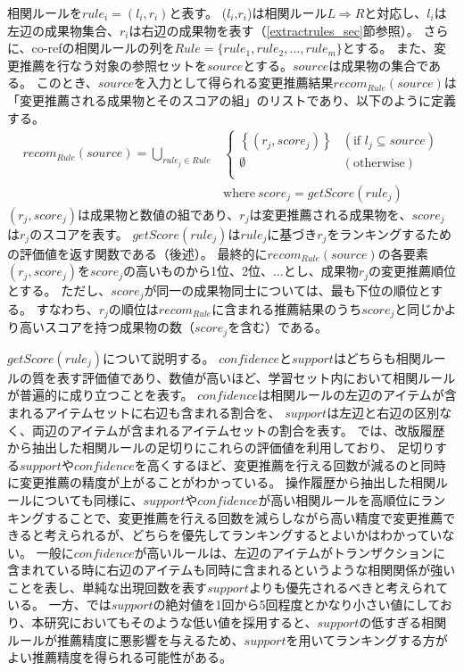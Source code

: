 \documentclass[a4paper]{jsbook}
\def\Ra{\Rightarrow}
\newcommand{\confidence}{con\!f\!idence}
\newcommand{\getScore}{getS\!core}
\begin{document}
相関ルールを$rule_i = (l_i,r_i)$と表す。
($l_i$,$r_i$)は相関ルール$L \Ra R$と対応し、$l_i$は左辺の成果物集合、$r_i$は右辺の成果物を表す（\ref{extractrules_sec}節参照）。
さらに、co-refの相関ルールの列を$Rule = \{rule_1, rule_2, \dots, rule_m\}$とする。
また、変更推薦を行なう対象の参照セットを$source$とする。$source$は成果物の集合である。
このとき、$source$を入力として得られる変更推薦結果$recom_{Rule}(source)$は「変更推薦される成果物とそのスコアの組」のリストであり、以下のように定義する。
\begin{eqnarray}
  recom_{Rule}\left(source\right) = \bigcup_{rule_j \in Rule}
    &\left\{
    \begin{array}{ll}
      \left\{\left(r_j,score_j \right)\right\} &(\textrm{if~} l_j \subseteq source) \\
      \emptyset &(\textrm{otherwise})\\
    \end{array}
    \right.\\
    &\textrm{where}~score_j = \getScore(rule_j)\nonumber
\end{eqnarray}
$\left(r_j,score_j\right)$は成果物と数値の組であり、$r_j$は変更推薦される成果物を、$score_j$は$r_j$のスコアを表す。
$\getScore(rule_j)$は$rule_j$に基づき$r_j$をランキングするための評価値を返す関数である（後述）。
最終的に$recom_{Rule}(source)$の各要素$(r_j,score_j)$を$score_j$の高いものから1位、2位、$\dots$とし、成果物$r_j$の変更推薦順位とする。
ただし、$score_j$が同一の成果物同士については、最も下位の順位とする。
すなわち、$r_j$の順位は$recom_{Rule}$に含まれる推薦結果のうち$score_j$と同じかより高いスコアを持つ成果物の数（$score_j$を含む）である。

$\getScore(rule_j)$について説明する。
$\confidence$と$support$はどちらも相関ルールの質を表す評価値であり、数値が高いほど、学習セット内において相関ルールが普遍的に成り立つことを表す。
$\confidence$は相関ルールの左辺のアイテムが含まれるアイテムセットに右辺も含まれる割合を、
$support$は左辺と右辺の区別なく、両辺のアイテムが含まれるアイテムセットの割合を表す。
\cite{Zimmermann:2005}では、改版履歴から抽出した相関ルールの足切りにこれらの評価値を利用しており、
足切りする$support$や$\confidence$を高くするほど、変更推薦を行える回数が減るのと同時に変更推薦の精度が上がることがわかっている。
操作履歴から抽出した相関ルールについても同様に、$support$や$\confidence$が高い相関ルールを高順位にランキングすることで、変更推薦を行える回数を減らしながら高い精度で変更推薦できると考えられるが、どちらを優先してランキングするとよいかはわかっていない。
一般に$\confidence$が高いルールは、左辺のアイテムがトランザクションに含まれている時に右辺のアイテムも同時に含まれるというような相関関係が強いことを表し、単純な出現回数を表す$support$よりも優先されるべきと考えられている。
一方、\cite{Zimmermann:2005}では$support$の絶対値を1回から5回程度とかなり小さい値にしており、本研究においてもそのような低い値を採用すると、$support$の低すぎる相関ルールが推薦精度に悪影響を与えるため、$support$を用いてランキングする方がよい推薦精度を得られる可能性がある。
\end{document}
